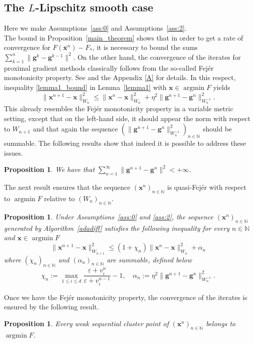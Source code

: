 \documentclass[11pt]{article}
\theoremstyle{plain}
\newtheorem{proposition}[theorem]{Proposition}
\theoremstyle{definition}
\theoremstyle{remark}
\newcommand{\norm}[1]{\lVert{#1}\rVert}
\DeclareMathOperator*{\argmin}{argmin}
\newcommand{\m}{d}
\newcommand{\bx}{\bm{x}}
\newcommand{\buu}{\bm{g}}
\newcommand{\iter}{n}
\newcommand{\ite}{k}
\newcommand{\N}{\mathbb{N}}
\newcommand{\W}{W}
\begin{document}
\subsection{The $L$-Lipschitz smooth case}
\label{sec:analysis_b}
Here we make Assumptions~\ref{ass:0} and Assumptions~\ref{ass:2}. \\
The bound in Proposition~\ref{main_theorem} shows that in order to get a rate of convergence 
for $F(\bar{\bx}^\iter)-F_*$, it is necessary to bound the sums $\sum_{\ite=1}^{\iter}\norm{\buu^\ite-\buu^{\ite-1}}^2$. On the other hand,
the convergence of the iterates for proximal gradient methods classically follows from the so-called Fej\'er monotonicity property.
See \cite{combettes2013variable} and the Appendix \ref{A} for details. In this respect,
inequality \eqref{lemma1_bound} in Lemma~\ref{lemma1} with $\bx\in \argmin F$ yields 
\begin{equation*}
    \norm{\bx^{\iter+1} - \bx}_{\W_\iter}^2\leq 
     \norm{\bx^\iter - \bx}_{\W_\iter}^2 + \eta^2 \norm{\buu^{\iter+1} - \buu^{\iter}}_{\W_\iter^{-1}}^2. 
\end{equation*}
This already resembles the Fej\'er monotonicity property in a variable metric setting,
except that on the left-hand side, it should appear the norm with respect to $\W_{\iter+1}$
and that again the sequence $(\norm{\buu^{\iter+1} - \buu^{\iter}}_{\W_\iter^{-1}}^2)_{\iter\in \N}$ should be summable. The following results show that indeed it is possible to address these issues.


\begin{proposition}\label{proposition5}
We have that $\sum_{\iter=1}^\infty \lVert \buu^{\iter+1} - \buu^\iter \rVert^2<+\infty$.
\end{proposition}
\noindent
The next result ensures that the sequence $(\bx^\iter)_{\iter\in \N}$ is 
quasi-Fej\'er  with respect to $\argmin F$ relative to $(\W_\iter)_{\iter\in \N}$.

\begin{proposition}
\label{prop:Fejer}
Under Assumptions~\ref{ass:0} and \ref{ass:2},
the sequence $(\bx^\iter)_{\iter\in \N}$ generated by Algorithm~\ref{adadiff} satisfies the following inequality  for every $\iter\in \N$ and $\bx\in \argmin F$
\begin{equation*}
\norm{\bx^{\iter+1}-\bx}^2_{\W_{\iter+1}} \leq (1+\chi_\iter) \norm{\bx^{\iter}-\bx}^2_{\W_{\iter}} + \alpha_\iter
\end{equation*}
where $(\chi_\iter)_{\iter\in \N}$ and $(\alpha_\iter)_{\iter\in \N}$ are summable, defined below
\begin{equation*}
\chi_\iter :=\max_{1\leq i\leq \m}\frac{\varepsilon + v_i^{\iter}}{\varepsilon + v_i^{\iter-1}}- 1, \quad
\alpha_\iter := \eta^2 \norm{\buu^{\iter+1} - \buu^{\iter}}_{\W_\iter^{-1}}^2.
\end{equation*}
\end{proposition}
\noindent
Once we have the Fej\'er monotonicity property, the convergence of the iterates is ensured by the following result. 
\begin{proposition}
\label{prop:clusterpoints}
Every weak sequential cluster point of $(\bx^{\iter})_{\iter\in \N}$ belongs to $\argmin F$.
\end{proposition}
\end{document}
